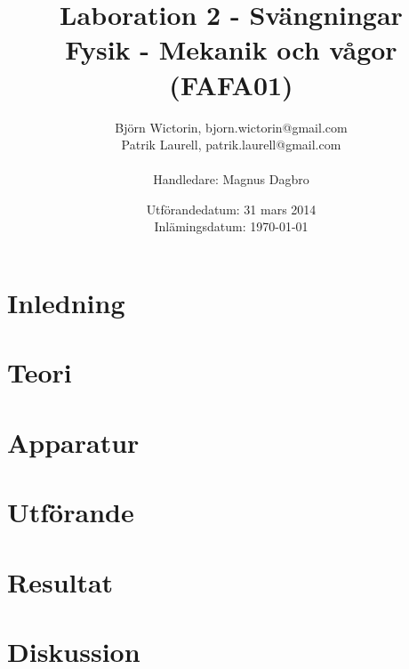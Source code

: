 \documentclass[a4paper,10pt]{article}
\title{Laboration 2 - Svängningar \\ Fysik - Mekanik och vågor (FAFA01)}
\author{Björn Wictorin, bjorn.wictorin@gmail.com \\ Patrik Laurell, patrik.laurell@gmail.com \\ \\ Handledare: Magnus Dagbro}
\date{Utförandedatum: 31 mars 2014 \\ Inlämingsdatum: \today}
\begin{document}
\maketitle
\thispagestyle{empty}
\newpage
{}
\tableofcontents{}
\pagebreak
{}

\section{Inledning}

\section{Teori}

\section{Apparatur}

\section{Utförande}

\section{Resultat}

\section{Diskussion}
\end{document}
